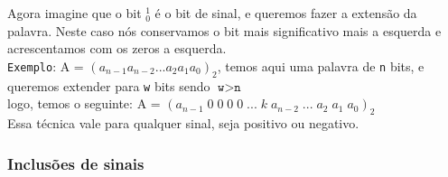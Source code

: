 \documentclass[12pt, onecolumn]{article}
\begin{document}
	Agora imagine que o bit $_0^1$ é o bit de sinal, e queremos fazer a
	extensão da palavra. Neste caso nós conservamos o bit mais
	significativo mais a esquerda e acrescentamos com os zeros a esquerda. \\
	\newline
	\texttt{Exemplo}: A = $(a_{n-1} a_{n-2} ... a_2 a_1 a_0)_2$, temos aqui
	uma palavra de \texttt{n} bits, e queremos extender para \texttt{w} bits
	sendo $\texttt{w} > \texttt{n}$ \\
	\newline
	logo, temos o seguinte: 
	A = $(a_{n-1}\;0\;0\;0\;0\;...\;k\;a_{n-2}\;...\;a_2\;a_1\;a_0)_2$ \\
	\newline
	Essa técnica vale para qualquer sinal, seja positivo ou negativo.
	
		\subsubsection{\centering Inclusões de sinais}
	
\end{document}
